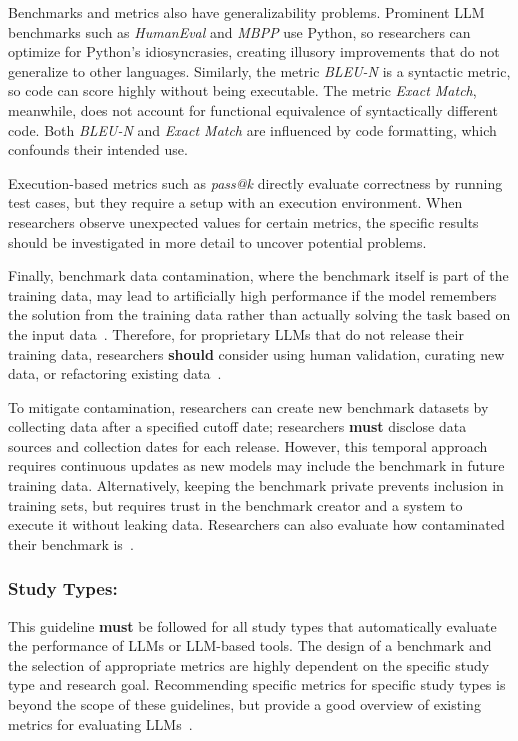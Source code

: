 \documentclass[smallextended]{svjour3}
\newcommand{\must}{\textbf{must}\xspace}
\newcommand{\should}{\textbf{should}\xspace}
\newcommand{\guidelinesubsubsection}[1]{\subsubsection{\bfseries #1:}}
\newcommand{\guidelinesubsubsection}[1]{\subsubsection{#1}}
\begin{document}
Benchmarks and metrics also have generalizability problems. Prominent LLM benchmarks such as \emph{HumanEval} and \emph{MBPP} use Python, so researchers can optimize for Python's idiosyncrasies, creating illusory improvements that do not generalize to other languages. Similarly, the metric \emph{BLEU-N} is a syntactic metric, so code can score highly without being executable. The metric \emph{Exact Match}, meanwhile, does not account for functional equivalence of syntactically different code. Both \emph{BLEU-N} and \emph{Exact Match} are influenced by code formatting, which confounds their intended use.

Execution-based metrics such as \emph{pass@k} directly evaluate correctness by running test cases, but they require a setup with an execution environment.
When researchers observe unexpected values for certain metrics, the specific results should be investigated in more detail to uncover potential problems.

Finally, benchmark data contamination, where the benchmark itself is part of the training data, may lead to artificially high performance if the model remembers the solution from the training data rather than actually solving the task based on the input data~\cite{DBLP:journals/corr/abs-2406-04244}. Therefore, for proprietary LLMs that do not release their training data, researchers \should consider using human validation, curating new data, or refactoring existing data~\cite{DBLP:journals/corr/abs-2406-04244}. 

To mitigate contamination, researchers can create new benchmark datasets by collecting data after a specified cutoff date; researchers \must disclose data sources and collection dates for each release. However, this temporal approach requires continuous updates as new models may include the benchmark in future training data. Alternatively, keeping the benchmark private prevents inclusion in training sets, but requires trust in the benchmark creator and a system to execute it without leaking data. Researchers can also evaluate how contaminated their benchmark is~\cite{DBLP:journals/corr/abs-2502-00678}.


\guidelinesubsubsection{Study Types}

This guideline \must be followed for all study types that automatically evaluate the performance of LLMs or LLM-based tools.
The design of a benchmark and the selection of appropriate metrics are highly dependent on the specific study type and research goal.
Recommending specific metrics for specific study types is beyond the scope of these guidelines, but \citeauthor{DBLP:journals/corr/abs-2505-08903} provide a good overview of existing metrics for evaluating LLMs~\cite{DBLP:journals/corr/abs-2505-08903}.
\end{document}
